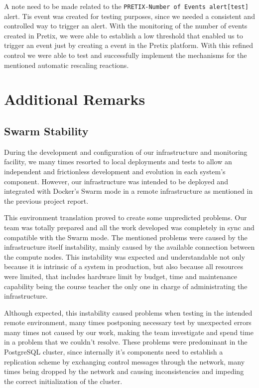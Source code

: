 \documentclass[12pt]{article}
\begin{document}
A note need to be made related to the \texttt{PRETIX-Number of Events alert[test]} alert. Tis event was created for testing purposes, since we needed a consistent and controlled way to trigger an alert. With the monitoring of the number of events created in Pretix, we were able to establish a low threshold that enabled us to trigger an event just by creating a event in the Pretix platform. With this refined control we were able to test and successfully implement the mechanisms for the mentioned automatic rescaling reactions.

\section{Additional Remarks} \label{remarks} %

\subsection{Swarm Stability} \label{remarks.stability} %

During the development and configuration of our infrastructure and monitoring facility, we many times resorted to local deployments and tests to allow an independent and frictionless development and evolution in each system's component. However, our infrastructure was intended to be deployed and integrated with Docker's Swarm mode in a remote infrastructure as mentioned in the previous project report.

This environment translation proved to create some unpredicted problems. Our team was totally prepared and all the work developed was completely in sync and compatible with the Swarm mode. The mentioned problems were caused by the infrastructure itself instability, mainly caused by the available connection between the compute nodes. This instability was expected and understandable not only because it is intrinsic of a system in production, but also because all resources were limited, that includes hardware limit by budget, time and maintenance capability being the course teacher the only one in charge of administrating the infrastructure.

Although expected, this instability caused problems when testing in the intended remote environment, many times postponing necessary test by unexpected errors many times not caused by our work, making the team investigate and spend time in a problem that we couldn't resolve. These problems were predominant in the PostgreSQL cluster, since internally it's components need to establish a replication scheme by exchanging control messages through the network, many times being dropped by the network and causing inconsistencies and impeding the correct initialization of the cluster.
\end{document}
